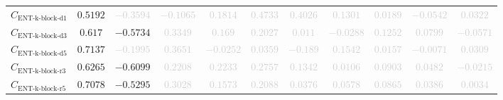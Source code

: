 \documentclass{standalone}
\newcommand{\entkblockdonename}{\text{ENT-k-block-d1}}
\newcommand{\entkblockdone}{C_{\entkblockdonename}}
\newcommand{\entkblockdthreename}{\text{ENT-k-block-d3}}
\newcommand{\entkblockdthree}{C_{\entkblockdthreename}}
\newcommand{\entkblockdfivename}{\text{ENT-k-block-d5}}
\newcommand{\entkblockdfive}{C_{\entkblockdfivename}}
\newcommand{\entkblockrthreename}{\text{ENT-k-block-r3}}
\newcommand{\entkblockrthree}{C_{\entkblockrthreename}}
\newcommand{\entkblockrfivename}{\text{ENT-k-block-r5}}
\newcommand{\entkblockrfive}{C_{\entkblockrfivename}}
\begin{document}
\begin{tabular}{lcccccccccc}
$\entkblockdone$ & $0.5192$ & \textcolor{lightgray}{$-0.3594$} & \textcolor{lightgray}{$-0.1065$} & \textcolor{lightgray}{$0.1814$} & \textcolor{lightgray}{$0.4733$} & \textcolor{lightgray}{$0.4026$} & \textcolor{lightgray}{$0.1301$} & \textcolor{lightgray}{$0.0189$} & \textcolor{lightgray}{$-0.0542$} & \textcolor{lightgray}{$0.0322$} \\ 
$\entkblockdthree$ & $0.617$ & $-0.5734$ & \textcolor{lightgray}{$0.3349$} & \textcolor{lightgray}{$0.169$} & \textcolor{lightgray}{$0.2027$} & \textcolor{lightgray}{$0.011$} & \textcolor{lightgray}{$-0.0288$} & \textcolor{lightgray}{$0.1252$} & \textcolor{lightgray}{$0.0799$} & \textcolor{lightgray}{$-0.0571$} \\ 
$\entkblockdfive$ & $0.7137$ & \textcolor{lightgray}{$-0.1995$} & \textcolor{lightgray}{$0.3651$} & \textcolor{lightgray}{$-0.0252$} & \textcolor{lightgray}{$0.0359$} & \textcolor{lightgray}{$-0.189$} & \textcolor{lightgray}{$0.1542$} & \textcolor{lightgray}{$0.0157$} & \textcolor{lightgray}{$-0.0071$} & \textcolor{lightgray}{$0.0309$} \\ 
$\entkblockrthree$ & $0.6265$ & $-0.6099$ & \textcolor{lightgray}{$0.2208$} & \textcolor{lightgray}{$0.2233$} & \textcolor{lightgray}{$0.2757$} & \textcolor{lightgray}{$0.1342$} & \textcolor{lightgray}{$0.0106$} & \textcolor{lightgray}{$0.0903$} & \textcolor{lightgray}{$0.0482$} & \textcolor{lightgray}{$-0.0215$} \\ 
$\entkblockrfive$ & $0.7078$ & $-0.5295$ & \textcolor{lightgray}{$0.3028$} & \textcolor{lightgray}{$0.1573$} & \textcolor{lightgray}{$0.2088$} & \textcolor{lightgray}{$0.0376$} & \textcolor{lightgray}{$0.0578$} & \textcolor{lightgray}{$0.0865$} & \textcolor{lightgray}{$0.0386$} & \textcolor{lightgray}{$0.0034$} \\ 
\bottomrule
\end{tabular}
\end{document}
